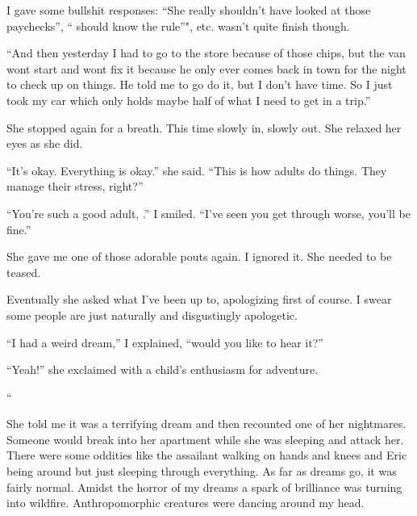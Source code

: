 \noindent
I gave some bullshit responses:
``She really shouldn't have looked at those paychecks'',
``\jasmine{} should know the rule''", etc.
\april{} wasn't quite finish though.
\VV


``And then yesterday I had to go to the store because of those chips, 
but the van wont start and \mike{} wont fix it because he only
ever comes back in town for the night to check up on things.
He told me to go do it, but I don't have time.  So I just took
my car which only holds maybe half of what I need to get in a trip.''
\VV

\noindent
She stopped again for a breath.  This time slowly in, slowly out.
She relaxed her eyes as she did.
\VV


\noindent
``It's okay. Everything is okay.'' she said.  ``This is how adults do things.
They manage their stress, right?''
\VV


``You're such a good adult, \april.''  I smiled.
``I've seen you get through worse, you'll be fine.''
\VV


\noindent
She gave me one of those adorable pouts again.  I ignored it.
She needed to be teased.
\VV


\noindent
Eventually she asked what I've been up to, apologizing first of course.
I swear some people are just naturally and disgustingly apologetic.
\VV


``I had a weird dream,'' I explained, ``would you like to hear it?''
\VV


``Yeah!'' she exclaimed with a child's enthusiasm for adventure.
\vspace*{3ex}


\begin{adjustwidth}{2em}{2em}
\noindent\Huge``\normalsize
\begin{adjustwidth}{1em}{1em}

\end{adjustwidth}
\end{adjustwidth}
\VV


\noindent
She told me it was a terrifying dream and then recounted one of
her nightmares.  Someone would break into her apartment while she
was sleeping and attack her.  There were some oddities like
the assailant walking on hands and knees and Eric being around
but just sleeping through everything.  As far as dreams go,
it was fairly normal.
\lhoarb
\noindent
Amidst the horror of my dreams a spark of brilliance was turning into wildfire.
Anthropomorphic creatures were dancing around my head.
\lhoarb

